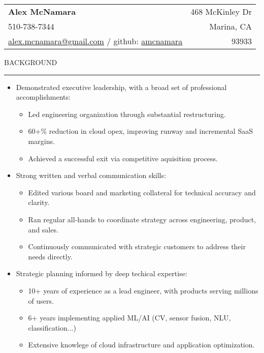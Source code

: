 \documentclass[12pt]{article}
\makeatletter
\newenvironment{justifycolumns}
{\begin{tabular*}{\textwidth}{@{\extracolsep{\fill}}lr@{}}}
{\end{tabular*}}
\newcommand{\row}[2]{#1 & #2 \\}
\newcommand{\blockseparation}{\vspace{0.13in}}
\newcommand{\heading}[1]{
	\vspace{0.05in}
	\uppercase{#1}
	\vspace{0.05in}
	\hrule
	\blockseparation
}
\newenvironment{tightbullets}
{\begin{itemize}}
{\end{itemize}}
\newenvironment{bullets}
{\begin{tightbullets}}
{\end{tightbullets} \blockseparation}
\makeatother
\begin{document}
\begin{flushleft}

\begin{justifycolumns}
	\row{\Large\textbf{Alex McNamara}}{468 McKinley Dr}
	\row{510-738-7344}{Marina, CA}
	\row{
		\href{mailto:alex.mcnamara@gmail.com}{alex.mcnamara@gmail.com} / github: 
		\href{http://www.github.com/amcnamara}{amcnamara}
	}{93933}
\end{justifycolumns}
\vspace{0.175in}

\heading{Background}
\begin{bullets}
	\item Demonstrated executive leadership, with a broad set of professional accomplishments:
	\begin{tightbullets}
		\item Led engineering organization through substantial restructuring.
		\item 60+\% reduction in cloud opex, improving runway and incremental SaaS margins.
		\item Achieved a successful exit via competitive aquisition process.
	\end{tightbullets}

	\item Strong written and verbal communication skills:
	\begin{tightbullets}
		\item Edited various board and marketing collateral for technical accuracy and clarity.
		\item Ran regular all-hands to coordinate strategy across engineering, product, and sales.
		\item Continuously communicated with strategic customers to address their needs directly.
	\end{tightbullets}

	\item Strategic planning informed by deep techical expertise:
	\begin{tightbullets}
		\item 10+ years of experience as a lead engineer, with products serving millions of users.
		\item 6+ years implementing applied ML/AI (CV, sensor fusion, NLU, classification...)
		\item Extensive knowlege of cloud infrastructure and application optimization.
	\end{tightbullets}
\end{bullets}



\end{flushleft}
\end{document}
